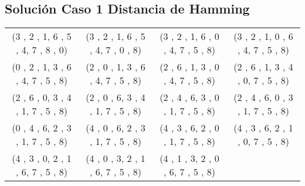 \documentclass[11pt]{article}
\begin{document}
\subsection{Solución Caso 1 Distancia de Hamming}
\setlength{\extrarowheight}{20pt}
\begin{tabular}{c c c c}
(3 , 2 , 1,
6 , 5 , 4,
7 , 8 , 0)

&

(3 , 2 , 1,
6 , 5 , 4,
7 , 0 , 8)

&

(3 , 2 , 1,
6 , 0 , 4,
7 , 5 , 8)

&

(3 , 2 , 1,
0 , 6 , 4,
7 , 5 , 8)

\\

(0 , 2 , 1,
3 , 6 , 4,
7 , 5 , 8)

&

(2 , 0 , 1,
3 , 6 , 4,
7 , 5 , 8)

&

(2 , 6 , 1,
3 , 0 , 4,
7 , 5 , 8)

&

(2 , 6 , 1,
3 , 4 , 0,
7 , 5 , 8)

\\

(2 , 6 , 0,
3 , 4 , 1,
7 , 5 , 8)

&

(2 , 0 , 6,
3 , 4 , 1,
7 , 5 , 8)

&

(2 , 4 , 6,
3 , 0 , 1,
7 , 5 , 8)

&

(2 , 4 , 6,
0 , 3 , 1,
7 , 5 , 8)

\\

(0 , 4 , 6,
2 , 3 , 1,
7 , 5 , 8)

&

(4 , 0 , 6,
2 , 3 , 1,
7 , 5 , 8)

&

(4 , 3 , 6,
2 , 0 , 1,
7 , 5 , 8)

&

(4 , 3 , 6,
2 , 1 , 0,
7 , 5 , 8)

\\

(4 , 3 , 0,
2 , 1 , 6,
7 , 5 , 8)

&

(4 , 0 , 3,
2 , 1 , 6,
7 , 5 , 8)

&

(4 , 1 , 3,
2 , 0 , 6,
7 , 5 , 8)


\end{tabular}
\end{document}
